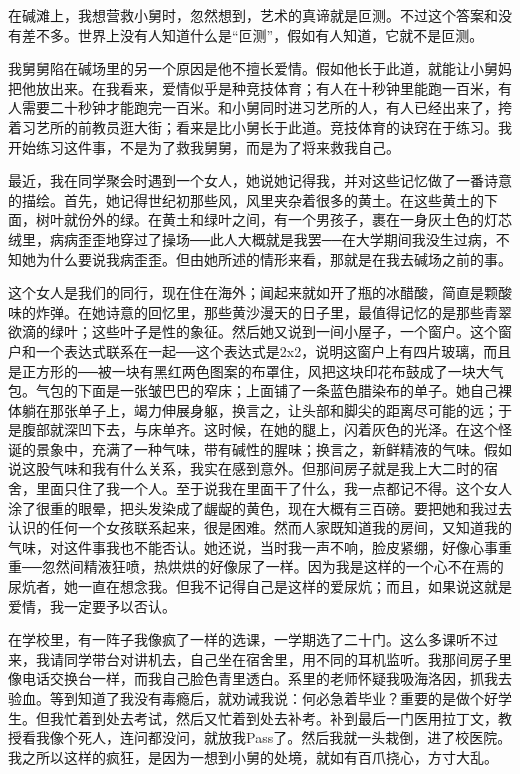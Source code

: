 在碱滩上，我想营救小舅时，忽然想到，艺术的真谛就是叵测。不过这个答案和没有差不多。世界上没有人知道什么是“叵测”，假如有人知道，它就不是叵测。 

我舅舅陷在碱场里的另一个原因是他不擅长爱情。假如他长于此道，就能让小舅妈把他放出来。在我看来，爱情似乎是种竞技体育；有人在十秒钟里能跑一百米，有人需要二十秒钟才能跑完一百米。和小舅同时进习艺所的人，有人已经出来了，挎着习艺所的前教员逛大街；看来是比小舅长于此道。竞技体育的诀窍在于练习。我开始练习这件事，不是为了救我舅舅，而是为了将来救我自己。 

最近，我在同学聚会时遇到一个女人，她说她记得我，并对这些记忆做了一番诗意的描绘。首先，她记得世纪初那些风，风里夹杂着很多的黄土。在这些黄土的下面，树叶就份外的绿。在黄土和绿叶之间，有一个男孩子，裹在一身灰土色的灯芯绒里，病病歪歪地穿过了操场──此人大概就是我罢──在大学期间我没生过病，不知她为什么要说我病歪歪。但由她所述的情形来看，那就是在我去碱场之前的事。 

这个女人是我们的同行，现在住在海外；闻起来就如开了瓶的冰醋酸，简直是颗酸味的炸弹。在她诗意的回忆里，那些黄沙漫天的日子里，最值得记忆的是那些青翠欲滴的绿叶；这些叶子是性的象征。然后她又说到一间小屋子，一个窗户。这个窗户和一个表达式联系在一起──这个表达式是2x2，说明这窗户上有四片玻璃，而且是正方形的──被一块有黑红两色图案的布罩住，风把这块印花布鼓成了一块大气包。气包的下面是一张皱巴巴的窄床；上面铺了一条蓝色腊染布的单子。她自己裸体躺在那张单子上，竭力伸展身躯，换言之，让头部和脚尖的距离尽可能的远；于是腹部就深凹下去，与床单齐。这时候，在她的腿上，闪着灰色的光泽。在这个怪诞的景象中，充满了一种气味，带有碱性的腥味；换言之，新鲜精液的气味。假如说这股气味和我有什么关系，我实在感到意外。但那间房子就是我上大二时的宿舍，里面只住了我一个人。至于说我在里面干了什么，我一点都记不得。这个女人涂了很重的眼晕，把头发染成了龌龊的黄色，现在大概有三百磅。要把她和我过去认识的任何一个女孩联系起来，很是困难。然而人家既知道我的房间，又知道我的气味，对这件事我也不能否认。她还说，当时我一声不响，脸皮紧绷，好像心事重重──忽然间精液狂喷，热烘烘的好像尿了一样。因为我是这样的一个心不在焉的尿炕者，她一直在想念我。但我不记得自己是这样的爱尿炕；而且，如果说这就是爱情，我一定要予以否认。 

在学校里，有一阵子我像疯了一样的选课，一学期选了二十门。这么多课听不过来，我请同学带台对讲机去，自己坐在宿舍里，用不同的耳机监听。我那间房子里像电话交换台一样，而我自己脸色青里透白。系里的老师怀疑我吸海洛因，抓我去验血。等到知道了我没有毒瘾后，就劝诫我说：何必急着毕业？重要的是做个好学生。但我忙着到处去考试，然后又忙着到处去补考。补到最后一门医用拉丁文，教授看我像个死人，连问都没问，就放我Pass了。然后我就一头栽倒，进了校医院。我之所以这样的疯狂，是因为一想到小舅的处境，就如有百爪挠心，方寸大乱。 

